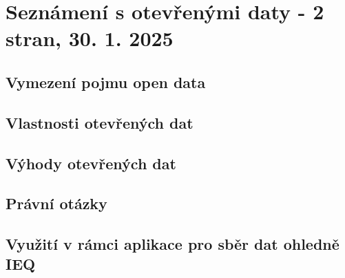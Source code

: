 \chapter{Seznámení s otevřenými daty - 2 stran, 30. 1. 2025}
\section{Vymezení pojmu open data}
\section{Vlastnosti otevřených dat}
\section{Výhody otevřených dat}
\section{Právní otázky}
\section{Využití v rámci aplikace pro sběr dat ohledně IEQ}
